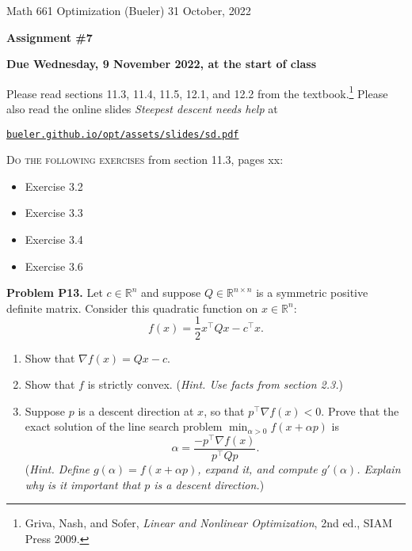 \documentclass[12pt]{amsart}
\newcommand{\RR}{\mathbb{R}}
\newcommand{\grad}{\nabla}
\newcommand{\prob}[1]{\bigskip\noindent\textbf{#1}\quad }
\begin{document}
\scriptsize \noindent Math 661 Optimization (Bueler) \hfill 31 October, 2022
\normalsize

\medskip\bigskip

\Large\centerline{\textbf{Assignment \#7}}
\large
\bigskip

\centerline{\textbf{Due Wednesday, 9 November 2022, at the start of class}}
\bigskip
\normalsize

\thispagestyle{empty}

\bigskip
Please read sections 11.3, 11.4, 11.5, 12.1, and 12.2 from the textbook.\footnote{Griva, Nash, and Sofer, \emph{Linear and Nonlinear Optimization}, 2nd ed., SIAM Press 2009.}  Please also read the online slides \emph{Steepest descent needs help} at

  \centerline{\href{https://bueler.github.io/opt/assets/slides/sd.pdf}{\texttt{bueler.github.io/opt/assets/slides/sd.pdf}}}

\bigskip
\noindent \textsc{Do the following exercises} from section 11.3, pages xx:

\begin{itemize}
\item Exercise 3.2
\item Exercise 3.3
\item Exercise 3.4
\item Exercise 3.6
\end{itemize}


\prob{Problem P13.}  Let $c\in\RR^n$ and suppose $Q\in \RR^{n\times n}$ is a symmetric positive definite matrix.  Consider this quadratic function on $x\in\RR^n$:
\begin{equation}
    f(x) = \frac{1}{2} x^\top Q x - c^\top x.   \label{quad}
\end{equation}

\medskip
\renewcommand{\labelenumi}{\textbf{\alph{enumi})}}
\begin{enumerate}
\item Show that $\grad f(x) = Q x - c$.
\item Show that $f$ is strictly convex.  (\emph{Hint.  Use facts from section 2.3.})
\item Suppose $p$ is a descent direction at $x$, so that $p^\top \grad f(x)<0$.  Prove that the exact solution of the line search problem $\min_{\alpha>0} f(x+\alpha p)$ is
    $$\alpha = \frac{-p^\top \grad f(x)}{p^\top Q p}.$$
(\emph{Hint.  Define $g(\alpha)=f(x+\alpha p)$, expand it, and compute $g'(\alpha)$.  Explain why is it important that $p$ is a descent direction.})
\end{enumerate}
\end{document}
